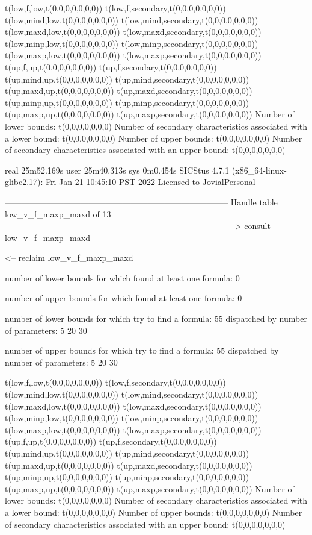 t(low,f,low,t(0,0,0,0,0,0,0))
t(low,f,secondary,t(0,0,0,0,0,0,0))
t(low,mind,low,t(0,0,0,0,0,0,0))
t(low,mind,secondary,t(0,0,0,0,0,0,0))
t(low,maxd,low,t(0,0,0,0,0,0,0))
t(low,maxd,secondary,t(0,0,0,0,0,0,0))
t(low,minp,low,t(0,0,0,0,0,0,0))
t(low,minp,secondary,t(0,0,0,0,0,0,0))
t(low,maxp,low,t(0,0,0,0,0,0,0))
t(low,maxp,secondary,t(0,0,0,0,0,0,0))
t(up,f,up,t(0,0,0,0,0,0,0))
t(up,f,secondary,t(0,0,0,0,0,0,0))
t(up,mind,up,t(0,0,0,0,0,0,0))
t(up,mind,secondary,t(0,0,0,0,0,0,0))
t(up,maxd,up,t(0,0,0,0,0,0,0))
t(up,maxd,secondary,t(0,0,0,0,0,0,0))
t(up,minp,up,t(0,0,0,0,0,0,0))
t(up,minp,secondary,t(0,0,0,0,0,0,0))
t(up,maxp,up,t(0,0,0,0,0,0,0))
t(up,maxp,secondary,t(0,0,0,0,0,0,0))
Number of lower bounds:                                             t(0,0,0,0,0,0,0)
Number of secondary characteristics associated with a lower bound:  t(0,0,0,0,0,0,0)
Number of upper bounds:                                             t(0,0,0,0,0,0,0)
Number of secondary characteristics associated with an upper bound: t(0,0,0,0,0,0,0)

real	25m52.169s
user	25m40.313s
sys	0m0.454s
SICStus 4.7.1 (x86_64-linux-glibc2.17): Fri Jan 21 10:45:10 PST 2022
Licensed to JovialPersonal


--------------------------------------------------------------------------------
Handle table low_v_f_maxp_maxd of 13
--------------------------------------------------------------------------------
--> consult low_v_f_maxp_maxd

<-- reclaim low_v_f_maxp_maxd

number of lower bounds for which found at least one formula: 0

number of upper bounds for which found at least one formula: 0

number of lower bounds for which try to find a formula: 55
dispatched by number of parameters: 5  20  30

number of upper bounds for which try to find a formula: 55
dispatched by number of parameters: 5  20  30

t(low,f,low,t(0,0,0,0,0,0,0))
t(low,f,secondary,t(0,0,0,0,0,0,0))
t(low,mind,low,t(0,0,0,0,0,0,0))
t(low,mind,secondary,t(0,0,0,0,0,0,0))
t(low,maxd,low,t(0,0,0,0,0,0,0))
t(low,maxd,secondary,t(0,0,0,0,0,0,0))
t(low,minp,low,t(0,0,0,0,0,0,0))
t(low,minp,secondary,t(0,0,0,0,0,0,0))
t(low,maxp,low,t(0,0,0,0,0,0,0))
t(low,maxp,secondary,t(0,0,0,0,0,0,0))
t(up,f,up,t(0,0,0,0,0,0,0))
t(up,f,secondary,t(0,0,0,0,0,0,0))
t(up,mind,up,t(0,0,0,0,0,0,0))
t(up,mind,secondary,t(0,0,0,0,0,0,0))
t(up,maxd,up,t(0,0,0,0,0,0,0))
t(up,maxd,secondary,t(0,0,0,0,0,0,0))
t(up,minp,up,t(0,0,0,0,0,0,0))
t(up,minp,secondary,t(0,0,0,0,0,0,0))
t(up,maxp,up,t(0,0,0,0,0,0,0))
t(up,maxp,secondary,t(0,0,0,0,0,0,0))
Number of lower bounds:                                             t(0,0,0,0,0,0,0)
Number of secondary characteristics associated with a lower bound:  t(0,0,0,0,0,0,0)
Number of upper bounds:                                             t(0,0,0,0,0,0,0)
Number of secondary characteristics associated with an upper bound: t(0,0,0,0,0,0,0)

